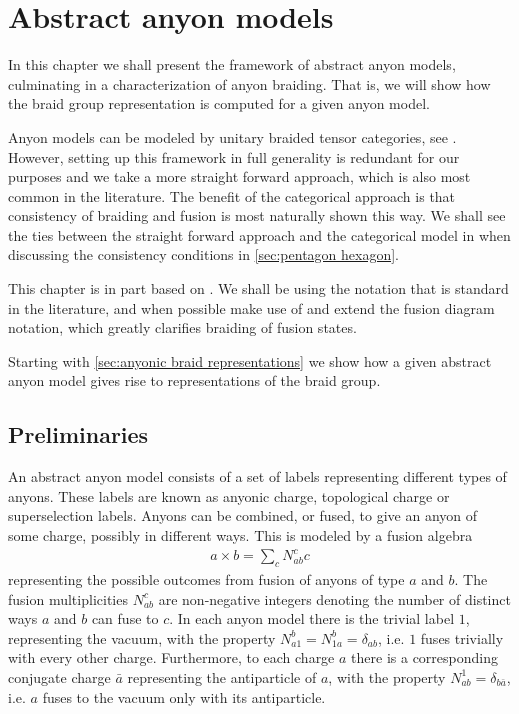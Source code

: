 \documentclass[a4paper,10pt,oneside]{book}
\theoremstyle{plain}
\theoremstyle{definition}
\theoremstyle{remark}
\begin{document}
\chapter{Abstract anyon models}\label{anyon models}

In this chapter we shall present the framework of abstract anyon models, culminating in a characterization of anyon braiding. That is, we will show how the braid group representation is computed for a given anyon model.

Anyon models can be modeled by unitary braided tensor categories, see \cite{kitaev,naaijkens}. However, setting up this framework in full generality is redundant for our purposes and we take a more straight forward approach, which is also most common in the literature. The benefit of the categorical approach is that consistency of braiding and fusion is most naturally shown this way. We shall see the ties between the straight forward approach and the categorical model in when discussing the consistency conditions in \cref{sec:pentagon hexagon}.

This chapter is in part based on \cite{preskill,kitaev,bonderson}. We shall be using the notation that is standard in the literature, and when possible make use of and extend the fusion diagram notation, which greatly clarifies braiding of fusion states.

Starting with \cref{sec:anyonic braid representations} we show how a given abstract anyon model gives rise to representations of the braid group.

\section{Preliminaries}

An abstract anyon model consists of a set of labels representing different types of anyons. These labels are known as anyonic charge, topological charge or superselection labels. Anyons can be combined, or fused, to give an anyon of some charge, possibly in different ways. This is modeled by a fusion algebra
\begin{align*}
  a \times b = \sum_c N_{ab}^c c
\end{align*}
representing the possible outcomes from fusion of anyons of type $a$ and $b$. The fusion multiplicities $N_{ab}^c$ are non-negative integers denoting the number of distinct ways $a$ and $b$ can fuse to $c$. In each anyon model there is the trivial label $1$, representing the vacuum, with the property $N_{a1}^b = N_{1a}^b = \delta_{ab}$, i.e. $1$ fuses trivially with every other charge. Furthermore, to each charge $a$ there is a corresponding conjugate charge $\bar{a}$ representing the antiparticle of $a$, with the property $N_{ab}^1 = \delta_{b\bar{a}}$, i.e. $a$ fuses to the vacuum only with its antiparticle.
\end{document}
